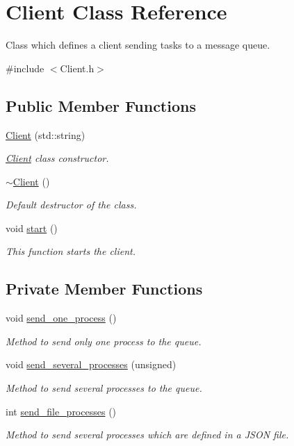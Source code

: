 \hypertarget{classClient}{\section{Client Class Reference}
\label{classClient}
}


Class which defines a client sending tasks to a message queue.  




{\ttfamily \#include $<$Client.\-h$>$}

\subsection*{Public Member Functions}
\begin{DoxyCompactItemize}
\item 
\hyperlink{classClient_af7faf381e7062b0135ab53c35dbb5542}{Client} (std\-::string)
\begin{DoxyCompactList}\small\item\em \hyperlink{classClient}{Client} class constructor. \end{DoxyCompactList}\item 
\hyperlink{classClient_a840e519ca781888cbd54181572ebe3a7}{$\sim$\-Client} ()
\begin{DoxyCompactList}\small\item\em Default destructor of the class. \end{DoxyCompactList}\item 
void \hyperlink{classClient_a742373e08a80d993d2651b6fff76f5b9}{start} ()
\begin{DoxyCompactList}\small\item\em This function starts the client. \end{DoxyCompactList}\end{DoxyCompactItemize}
\subsection*{Private Member Functions}
\begin{DoxyCompactItemize}
\item 
void \hyperlink{classClient_a8d04b32a55421cf157bc9464bbad74f2}{send\-\_\-one\-\_\-process} ()
\begin{DoxyCompactList}\small\item\em Method to send only one process to the queue. \end{DoxyCompactList}\item 
void \hyperlink{classClient_a4f8c14b12c882c97401b4e3c7965678f}{send\-\_\-several\-\_\-processes} (unsigned)
\begin{DoxyCompactList}\small\item\em Method to send several processes to the queue. \end{DoxyCompactList}\item 
int \hyperlink{classClient_a4a2730dfdf3e84352f79ad85f5306346}{send\-\_\-file\-\_\-processes} ()
\begin{DoxyCompactList}\small\item\em Method to send several processes which are defined in a J\-S\-O\-N file. \end{DoxyCompactList}\end{DoxyCompactItemize}
